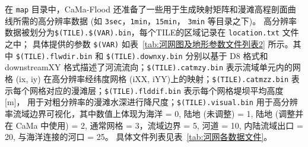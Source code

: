 在 \texttt{map} 目录中，CaMa-Flood 还准备了一些用于生成映射矩阵和漫滩高程剖面曲线所需的高分辨率数据 (如 \texttt{3sec}，\texttt{1min}，\texttt{15min}，
\texttt{3min} 等目录之下)。
高分辨率数据被划分为\texttt{\$(TILE).\$(VAR).bin}，每个TILE的区域记录在 \texttt{location.txt} 文件之中；
具体提供的参数 \texttt{\$(VAR)} 如表~\ref{tab:河网图及地形参数文件列表2} 所示。其中 \texttt{\$(TILE).flwdir.bin} 和
\texttt{\$(TILE).downxy.bin} 分别以基于 D8 格式和 downstreamXY 格式描述了河流流向；\texttt{\$(TILE).catmzy.bin} 表示流域单元内的网格 (ix, iy) 
在高分辨率经纬度网格 (iXX, iYY)上的映射；\texttt{\$(TILE).catmzz.bin} 表示每个网格对应的漫滩层；\texttt{\$(TILE).flddif.bin} 表示每个网格堤坝平均高度 [m]，
用于对粗分辨率的漫滩水深进行降尺度；\texttt{\$(TILE).visual.bin} 用于高分辨率流域边界可视化，其中数值上体现为海洋 = 0, 
陆地 (未调整) = 1, 陆地 (调整并在 CaMa 中使用) = 2, 通常网格 = 3，流域边界 = 5, 河道 = 10, 内陆流域出口 = 20, 与海洋连接的河口 = 25。
具体文件列表见表~\ref{tab:河网各数据文件}。

